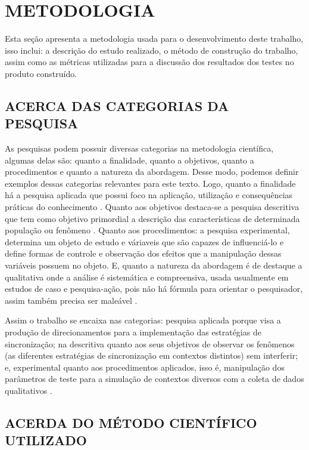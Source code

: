 \section{METODOLOGIA}

Esta seção apresenta a metodologia usada para o desenvolvimento deste trabalho, isso inclui: a descrição do estudo realizado, o método de construção do trabalho, assim como as métricas utilizadas para a discussão dos resultados dos testes no produto construído.

\subsection{ACERCA DAS CATEGORIAS DA PESQUISA}

As pesquisas podem possuir diversas categorias na metodologia científica, algumas delas são: quanto a finalidade, quanto a objetivos, quanto a procedimentos e quanto a natureza da abordagem. Desse modo, podemos definir exemplos dessas categorias relevantes para este texto. Logo, quanto a finalidade há a pesquisa aplicada que possui foco na aplicação, utilização e consequências práticas do conhecimento \cite{gil2008metodos}. Quanto aos objetivos destaca-se a pesquisa descritiva que tem como objetivo primordial a descrição das características de determinada população ou fenômeno \cite{gil2002como}. Quanto aos procedimentos: a pesquisa experimental, determina um objeto de estudo e váriaveis que são capazes de influenciá-lo e define formas de controle e observação dos efeitos que a manipulação dessas variáveis possuem no objeto. E, quanto a natureza da abordagem é de destaque a qualitativa onde a análise é sistemática e compreensiva, usada usualmente em estudos de caso e pesquisa-ação, pois não há fórmula para orientar o pesquisador, assim também precisa ser maleável \cite{gil2008metodos}.

Assim o trabalho se encaixa nas categorias: pesquisa aplicada porque visa a produção de direcionamentos para a implementação das estratégias de sincronização; na descritiva quanto aos seus objetivos de observar os fenômenos (as diferentes estratégias de sincronização em contextos distintos) sem interferir; e, experimental quanto aos procedimentos aplicados, isso é, manipulação dos parâmetros de teste para a simulação de contextos diversos com a coleta de dados qualitativos \cite{gil2008metodos}.


\subsection{ACERDA DO MÉTODO CIENTÍFICO UTILIZADO}

